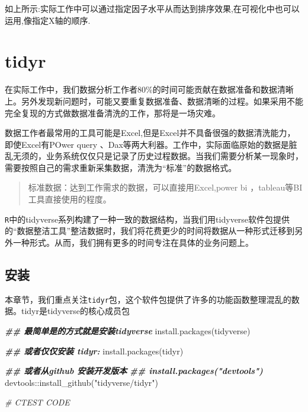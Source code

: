 \documentclass[
]{book}
\newenvironment{Shaded}{\begin{snugshade}}{\end{snugshade}}
\newcommand{\CommentTok}[1]{\textcolor[rgb]{0.56,0.35,0.01}{\textit{#1}}}
\newcommand{\DocumentationTok}[1]{\textcolor[rgb]{0.56,0.35,0.01}{\textbf{\textit{#1}}}}
\newcommand{\FunctionTok}[1]{\textcolor[rgb]{0.00,0.00,0.00}{#1}}
\newcommand{\NormalTok}[1]{#1}
\newcommand{\SpecialCharTok}[1]{\textcolor[rgb]{0.00,0.00,0.00}{#1}}
\newcommand{\StringTok}[1]{\textcolor[rgb]{0.31,0.60,0.02}{#1}}
\begin{document}
如上所示:实际工作中可以通过指定因子水平从而达到排序效果,在可视化中也可以运用,像指定X轴的顺序.

\hypertarget{tidyr}{%
\chapter{tidyr}\label{tidyr}}

在实际工作中，我们数据分析工作者80\%的时间可能贡献在数据准备和数据清晰上。另外发现新问题时，可能又要重复数据准备、数据清晰的过程。如果采用不能完全复现的方式做数据准备清洗的工作，那将是一场灾难。

数据工作者最常用的工具可能是Excel,但是Excel并不具备很强的数据清洗能力，即使Excel有POwer query 、Dax等两大利器。工作中，实际面临原始的数据是脏乱无须的，业务系统仅仅只是记录了历史过程数据。当我们需要分析某一现象时，需要按照自己的需求重新采集数据，清洗为``标准''的数据格式。

\begin{quote}
标准数据：达到工作需求的数据，可以直接用Excel,power bi ，tableau等BI工具直接使用的程度。
\end{quote}

\texttt{R}中的tidyverse系列构建了一种一致的数据结构，当我们用tidyverse软件包提供的``数据整洁工具''整洁数据时，我们将花费更少的时间将数据从一种形式迁移到另外一种形式。从而，我们拥有更多的时间专注在具体的业务问题上。

\hypertarget{ux5b89ux88c5-2}{%
\section{安装}\label{ux5b89ux88c5-2}}

本章节，我们重点关注\texttt{tidyr}包，这个软件包提供了许多的功能函数整理混乱的数据。tidyr是tidyverse的核心成员包

\begin{Shaded}
\begin{Highlighting}[]
\DocumentationTok{\#\# 最简单是的方式就是安装tidyverse}
\FunctionTok{install.packages}\NormalTok{(}\StringTok{\textquotesingle{}tidyverse\textquotesingle{}}\NormalTok{)}

\DocumentationTok{\#\# 或者仅仅安装 tidyr:}
\FunctionTok{install.packages}\NormalTok{(}\StringTok{\textquotesingle{}tidyr\textquotesingle{}}\NormalTok{)}

\DocumentationTok{\#\# 或者从github 安装开发版本}
\DocumentationTok{\#\# install.packages("devtools")}
\NormalTok{devtools}\SpecialCharTok{::}\FunctionTok{install\_github}\NormalTok{(}\StringTok{"tidyverse/tidyr"}\NormalTok{)}

\CommentTok{\# CTEST CODE}
\end{Highlighting}
\end{Shaded}
\end{document}
